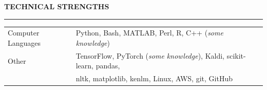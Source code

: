 \documentclass{resume} %
\begin{document}
\vspace{.5cm}
\sectionskip
\MakeUppercase{\textbf{Technical Strengths}}
  \sectionlineskip
  \hrule
\vspace{.5cm}

\begin{tabular}{ll}
Computer Languages & Python, Bash, MATLAB, Perl, R, C++ (\textit{some knowledge}) \\
Other & TensorFlow, PyTorch (\textit{some knowledge}), Kaldi, scikit-learn, pandas,\\
& nltk, matplotlib, kenlm, Linux, AWS, git, GitHub \\
\end{tabular}
\end{document}
